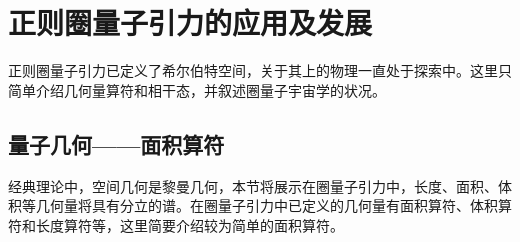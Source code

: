 
\chapter{正则圈量子引力的应用及发展}
\label{chp-application}

	正则圈量子引力已定义了希尔伯特空间，关于其上的物理一直处于探索中。这里只简单介绍几何量算符和相干态，并叙述圈量子宇宙学的状况。

	\section{量子几何——面积算符}

		经典理论中，空间几何是黎曼几何，本节将展示在圈量子引力中，长度、面积、体积等几何量将具有分立的谱。在圈量子引力中已定义的几何量有面积算符\cite{Rovelli1994,Ashtekar:1996eg}、体积算符\cite{Ashtekar:1994wa,Rovelli1994,Ashtekar:1997fb}和长度算符\cite{Thiemann:1996at}等，这里简要介绍较为简单的面积算符。

